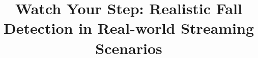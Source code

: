 \documentclass[runningheads]{llncs}
\newcommand{\corr}{(\Letter)}
\begin{document}
\title{Watch Your Step: Realistic Fall Detection in Real-world Streaming Scenarios}

\author{}
\institute{}
\maketitle         
\end{document}
